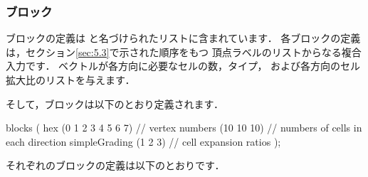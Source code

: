 \subsubsection{ブロック}
\label{sssec:5.3.1.3}
ブロックの定義は
%
%
と名づけられたリストに含まれています．
各ブロックの定義は，セクション\autoref{sec:5.3}で示された順序をもつ
頂点ラベルのリストからなる複合入力です．
ベクトルが各方向に必要なセルの数，タイプ，
および各方向のセル拡大比のリストを与えます．

そして，ブロックは以下のとおり定義されます．
\begin{OFverbatim}[file]
blocks
(
hex (0 1 2 3 4 5 6 7) // vertex numbers
(10 10 10) // numbers of cells in each direction
simpleGrading (1 2 3) // cell expansion ratios
);
\end{OFverbatim}
それぞれのブロックの定義は以下のとおりです．
